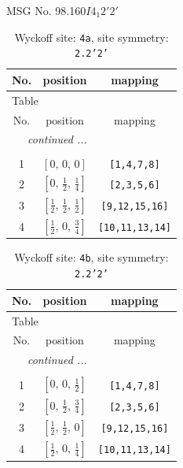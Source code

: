 \documentclass[fleqn,8pt]{jsarticle}
\begin{document}
\setcounter{MaxMatrixCols}{32}

\renewcommand{\tablename}{Table~}
\renewcommand{\figurename}{Figure~}
\begin{center}
\LARGE
MSG No. 98.160\quad$I4_{1}2'2'$
\end{center}
\renewcommand{\arraystretch}{1.2}
\begin{longtable}{ccc}
\caption{Wyckoff site: {\tt 4a}, site symmetry: {\tt 2.2'2'}}
 \\
 \hline \hline
No. & position & mapping \\ \hline \endfirsthead

\multicolumn{2}{l}{\tablename\ \thetable{}} \\
 \hline \hline
No. & position & mapping \\ \hline \endhead

 \hline \hline
\multicolumn{2}{r}{\footnotesize\it continued ...} \\ \endfoot

 \hline \hline
\multicolumn{2}{r}{} \\ \endlastfoot

1 & $\left[ 0,\, 0,\, 0 \right]$ & {\tt [1,4,7,8]} \\ \hline
2 & $\left[ 0,\, \frac{1}{2},\, \frac{1}{4} \right]$ & {\tt [2,3,5,6]} \\ \hline
3 & $\left[ \frac{1}{2},\, \frac{1}{2},\, \frac{1}{2} \right]$ & {\tt [9,12,15,16]} \\ \hline
4 & $\left[ \frac{1}{2},\, 0,\, \frac{3}{4} \right]$ & {\tt [10,11,13,14]} \\
\end{longtable}
\renewcommand{\arraystretch}{1.2}
\begin{longtable}{ccc}
\caption{Wyckoff site: {\tt 4b}, site symmetry: {\tt 2.2'2'}}
 \\
 \hline \hline
No. & position & mapping \\ \hline \endfirsthead

\multicolumn{2}{l}{\tablename\ \thetable{}} \\
 \hline \hline
No. & position & mapping \\ \hline \endhead

 \hline \hline
\multicolumn{2}{r}{\footnotesize\it continued ...} \\ \endfoot

 \hline \hline
\multicolumn{2}{r}{} \\ \endlastfoot

1 & $\left[ 0,\, 0,\, \frac{1}{2} \right]$ & {\tt [1,4,7,8]} \\ \hline
2 & $\left[ 0,\, \frac{1}{2},\, \frac{3}{4} \right]$ & {\tt [2,3,5,6]} \\ \hline
3 & $\left[ \frac{1}{2},\, \frac{1}{2},\, 0 \right]$ & {\tt [9,12,15,16]} \\ \hline
4 & $\left[ \frac{1}{2},\, 0,\, \frac{1}{4} \right]$ & {\tt [10,11,13,14]} \\
\end{longtable}
\end{document}
